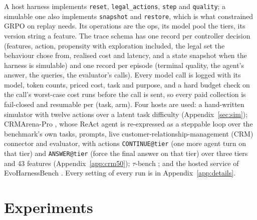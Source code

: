 \documentclass[10pt]{article}
\newcommand{\code}[1]{\texttt{#1}}
\begin{document}
A host harness implements \code{reset}, \code{legal\_actions}, \code{step} and \code{quality}; a simulable one also implements \code{snapshot} and \code{restore}, which is what constrained GRPO on replay needs. Its operations are the ops, its model pool the tiers, its version string a feature. The trace schema has one record per controller decision (features, action, propensity with exploration included, the legal set the behaviour chose from, realised cost and latency, and a state snapshot when the harness is simulable) and one record per episode (terminal quality, the agent's answer, the queries, the evaluator's calls). Every model call is logged with its model, token counts, priced cost, task and purpose, and a hard budget check on the call's worst-case cost runs before the call is sent, so every paid collection is fail-closed and resumable per (task, arm). Four hosts are used: a hand-written simulator with twelve actions over a latent task difficulty (Appendix~\ref{sec:sim}); CRMArena-Pro \citep{crmarenapro2025}, whose ReAct agent \citep{yao2023react} is re-expressed as a steppable loop over the benchmark's own tasks, prompts, live customer-relationship-management (CRM) connector and evaluator, with actions \code{CONTINUE@tier} (one more agent turn on that tier) and \code{ANSWER@tier} (force the final answer on that tier) over three tiers and 43 features (Appendix~\ref{app:crm50}); $\tau$-bench \citep{taubench2024}; and the hosted service of EvoHarnessBench \citep{evoharnessbench2026}. Every setting of every run is in Appendix~\ref{app:details}.

\section{Experiments}
\label{sec:results}
\end{document}
